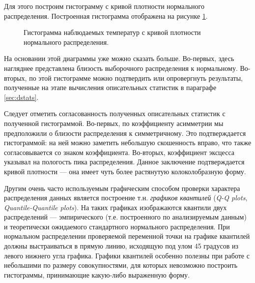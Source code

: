 Для этого построим гистограмму с кривой плотности нормального распределения. Построенная гистограмма отображена на рисунке \ref{img:histogram_fitted}.
\begin{figure}[ht]
\caption{Гистограмма наблюдаемых температур с кривой плотности нормального распределения.}
\label{img:histogram_fitted}
\end{figure}
На основании этой диаграммы уже можно сказать больше. Во-первых, здесь нагляднее представлена близость выборочного распределения к нормальному. Во-вторых, по этой гистограмме можно подтвердить или опровергнуть результаты, полученные на этапе вычисления описательных статистик в параграфе \ref{sec:dstats}.

Следует отметить согласованность полученных описательных статистик с полученной гистограммой. Во-первых, по коэффициенту асимметрии мы предположили о близости распределения к симметричному. Это подтверждается гистограммой: на ней можно заметить небольшую скошенность вправо, что также согласовывается со знаком коэффициента. Во-вторых, коэффициент эксцесса указывал на пологость пика распределения. Данное заключение подтверждается кривой плотности --- она имеет чуть более растянутую колоколобразную форму.

Другим очень часто используемым графическим способом проверки характера распределения данных является построение т.н. \textit{графиков квантилей} (\textit{Q-Q plots}, \textit{Quantile-Quantile plots}). На таких графиках изображаются квантили двух распределений --- эмпирического (т.е. построенного по анализируемым данным) и теоретически ожидаемого стандартного нормального распределения. При нормальном распределении проверяемой переменной точки на графике квантилей должны выстраиваться в прямую линию, исходящую под улом 45 градусов из левого нижнего угла графика. Графики квантилей особенно полезны при работе с небольшими по размеру совокупностями, для которых невозможно построить гистограммы, принимающие какую-либо выраженную форму.

